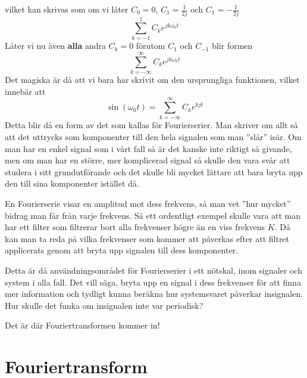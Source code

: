 \documentclass{article}
\begin{document}
vilket kan skrivas som om vi låter $C_0=0$, $C_{1}=\frac{1}{2j}$ och $C_{1}=-\frac{1}{2j}$
\[ \sum_{k=-1}^1 C_k e^{j k \omega_0 t} \]
Låter vi nu även \textbf{alla} andra $C_k = 0$ förutom  $C_1$ och $C_{-1}$ blir formen
\[ \sum_{k=-\infty}^{\infty} C_k e^{j k \omega_0 t} \]
Det magiska är då att vi bara har skrivit om den ursprungliga funktionen, vilket innebär att 
\[ \sin(\omega_0 t) = \sum_{k=-\infty}^{\infty} C_k e^{k j t} \]
Detta blir då en form av det som kallas för Fourierserier. Man skriver om allt så att det uttrycks som komponenter till den hela signalen som man ''slår'' isär. Om man har en enkel signal som i vårt fall så är det kanske inte riktigt så givande, men om man har en större, mer komplicerad signal så skulle den vara svår att studera i sitt grundutförande och det skulle bli mycket lättare att bara bryta upp den till sina komponenter istället då.

En Fourierserie visar en amplitud mot dess frekvens, så man vet ''hur mycket'' bidrag man får från varje frekvens. Så ett ordentligt exempel skulle vara att man har ett filter som filtrerar bort alla frekvenser högre än en viss frekvens $K$. %
Då kan man ta reda på vilka frekvenser som kommer att påverkas efter att filtret applicerats genom att bryta upp signalen till dess komponenter. 

Detta är då användningsområdet för Fourierserier i ett nötskal, inom signaler och system i alla fall. Det vill säga, bryta upp en signal i dess frekvenser för att finna mer information och tydligt kunna beräkna hur systemsvaret påverkar insignalen. Hur skulle det funka om insignalen inte var periodisk? 

Det är där Fouriertransformen kommer in!

\section{Fouriertransform}
\end{document}
